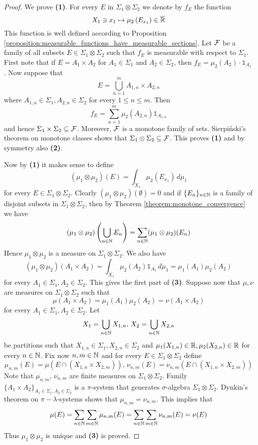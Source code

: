 \begin{proof}
    We prove \textbf{(1)}. For every $E$ in $\Sigma_1\otimes \Sigma_2$ we denote by $f_E$ the function
    $$X_1\ni x_1 \mapsto \mu_2\left(E_{x_1}\right)\in \overline{{\mathbb R}}$$
    This function is well defined according to Proposition \ref{proposition:measurable_functions_have_measurable_sections}. Let ${\mathcal F}$ be a family of all subsets $E\in \Sigma_1\otimes \Sigma_2$ such that $f_E$ is measurable with respect to $\Sigma_1$. First note that if $E=A_1 \times A_2$ for $A_1\in \Sigma_1$ and $A_2\in \Sigma_2$, then  $f_E = \mu_2(A_2)\cdot \mathbb{1}_{A_1}$. Now suppose that
    $$E= \bigcup_{n=1}^mA_{1,n}\times A_{2,n}$$
    where $A_{1,n}\in \Sigma_1,A_{2,n}\in \Sigma_2$ for every $1\leq n\leq m$. Then
    $$f_E = \sum_{n=1}^m\mu_2(A_{2,n})\mathbb{1}_{A_{1,n}}$$
    and hence $\Sigma_1\times \Sigma_2\subseteq {\mathcal F}$. Moreover, ${\mathcal F}$ is a monotone family of sets. Sierpiński's theorem on monotone classes shows that $\Sigma_1\otimes \Sigma_2\subseteq {\mathcal F}$. This proves \textbf{(1)} and by symmetry also \textbf{(2)}.
    
    Now by \textbf{(1)} it makes sense to define
    $$(\mu_1\otimes \mu_2)(E) = \int_{X_1}\mu_2(E_{x_1})\,d\mu_1$$
    for every $E\in \Sigma_1\otimes \Sigma_2$. Clearly $(\mu_1\otimes \mu_2)(\emptyset) = 0$ and if $\{E_n\}_{n\in {\mathbb N}}$ is a family of disjoint subsets in $\Sigma_1\otimes \Sigma_2$, then by Theorem \ref{theorem:monotone_convergence} we have
    $$(\mu_1\otimes \mu_2)\left(\bigcup_{n\in {\mathbb N}}E_n\right) = \sum_{n\in {\mathbb N}}(\mu_1\otimes \mu_2)(E_n)$$
    Hence $\mu_1\otimes \mu_2$ is a measure on $\Sigma_1\otimes \Sigma_2$. We also have
    $$(\mu_1\otimes \mu_2)\left(A_1\times A_2\right) = \int_{X_1}\mu_2(A_2)\mathbb{1}_{A_1}\,d\mu_1 = \mu_1(A_1)\mu_2(A_2)$$
    for every $A_1\in \Sigma_1, A_2\in \Sigma_2$. This gives the first part of \textbf{(3)}. Suppose now that $\mu,\nu$ are measures on $\Sigma_1\otimes \Sigma_2$ such that
    $$\mu(A_1\times A_2) = \mu_1(A_1)\mu_2(A_2) = \nu(A_1\times A_2)$$
    for every $A_1\in \Sigma_1,A_2\in \Sigma_2$. Let
    $$X_1 = \bigcup_{n\in {\mathbb N}}X_{1,n},\,X_2 = \bigcup_{n\in {\mathbb N}}X_{2,n}$$
    be partitions such that $X_{1,n}\in \Sigma_1,X_{2,n}\in \Sigma_2$ and $\mu_1(X_{1,n})\in {\mathbb R},\mu_2(X_{2,n})\in {\mathbb R}$ for every $n\in {\mathbb N}$. Fix now $n,m\in {\mathbb N}$ and for every $E\in \Sigma_1\otimes \Sigma_2$ define
    $$\mu_{n,m}(E) = \mu\left(E\cap (X_{1,n}\times  X_{2,m})\right),\,\nu_{n,m}(E) = \nu_{n,m}\left(E\cap (X_{1,n}\times X_{2,m})\right)$$
    Note that $\mu_{n,m},\,\nu_{n,m}$ are finite measures on $\Sigma_1\otimes \Sigma_2$. Family $\big\{A_1\times A_2\big\}_{A_1\in \Sigma_1,A_2\in \Sigma_2}$ is a $\pi$-system that generates $\sigma$-algebra $\Sigma_1\otimes \Sigma_2$. Dynkin's theorem on $\pi-\lambda$-systems shows that $\mu_{n,m} = \nu_{n,m}$. This implies that
    $$\mu(E) = \sum_{n\in {\mathbb N}}\sum_{m\in {\mathbb N}}\mu_{n,m}(E) = \sum_{n\in {\mathbb N}}\sum_{m\in {\mathbb N}}\nu_{n,m}(E) = \nu(E)$$
    Thus $\mu_1\otimes \mu_2$ is unique and \textbf{(3)} is proved.
    

\end{proof}

